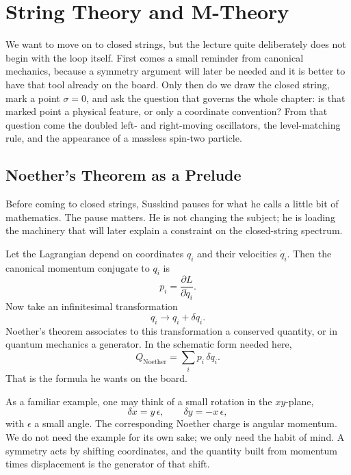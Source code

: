 \chapter{String Theory and M-Theory}

We want to move on to closed strings, but the lecture quite deliberately does not begin with the loop itself. First comes a small reminder from canonical mechanics, because a symmetry argument will later be needed and it is better to have that tool already on the board. Only then do we draw the closed string, mark a point \(\sigma=0\), and ask the question that governs the whole chapter: is that marked point a physical feature, or only a coordinate convention? From that question come the doubled left- and right-moving oscillators, the level-matching rule, and the appearance of a massless spin-two particle.

\section{Noether's Theorem as a Prelude}

Before coming to closed strings, Susskind pauses for what he calls a little bit of mathematics. The pause matters. He is not changing the subject; he is loading the machinery that will later explain a constraint on the closed-string spectrum.

Let the Lagrangian depend on coordinates \(q_i\) and their velocities \(\dot q_i\). Then the canonical momentum conjugate to \(q_i\) is
\begin{equation}
p_i=\frac{\partial L}{\partial \dot q_i}.
\end{equation}
Now take an infinitesimal transformation
\begin{equation}
q_i \longrightarrow q_i+\delta q_i.
\end{equation}
Noether's theorem associates to this transformation a conserved quantity, or in quantum mechanics a generator. In the schematic form needed here,
\begin{equation}
Q_{\mathrm{Noether}}=\sum_i p_i\,\delta q_i.
\end{equation}
That is the formula he wants on the board.

As a familiar example, one may think of a small rotation in the \(xy\)-plane,
\begin{equation}
\delta x = y\,\epsilon,
\qquad
\delta y = -x\,\epsilon,
\end{equation}
with \(\epsilon\) a small angle. The corresponding Noether charge is angular momentum. We do not need the example for its own sake; we only need the habit of mind. A symmetry acts by shifting coordinates, and the quantity built from momentum times displacement is the generator of that shift.


